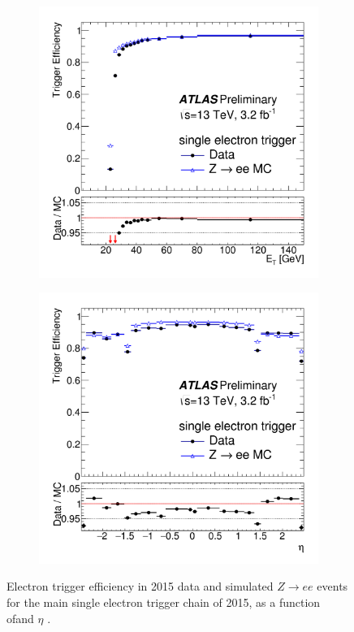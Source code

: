 \begin{figure}[h]
\begin{center}
\begin{subfigure}[b]{0.45\textwidth}
\centering
      \includegraphics[width=\textwidth]{fig/ele_trigger_eff_et.png}
     \caption{}
      \label{fig:ele_trigger_et_eff}
  \end{subfigure}
 \begin{subfigure}[b]{0.45\textwidth}
 \centering
      \includegraphics[width=\textwidth]{fig/ele_trigger_eff_eta.png}
      \caption{}
      \label{fig:ele_trigger_eta_eff}
  \end{subfigure}
\caption{Electron trigger efficiency in 2015 data and simulated $Z\rightarrow ee$ events for the main single electron trigger chain of 2015, as a function of\et and $\eta$ \cite{ATLAS-CONF-2016-024}.} 
 \label{fig:ele_trigger_eff}
\end{center}
\end{figure}

